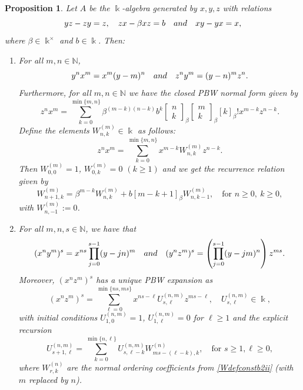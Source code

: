 \documentclass[10pt,a4paper]{amsart}
\newtheorem{proposition}{Proposition}
\begin{document}
\begin{proposition}\label{case(2)(ii)}
Let $A$ be the $\Bbbk$-algebra generated by $x,y,z$ with relations
\[
yz - zy = z, \quad zx - \beta xz = b \quad {\rm and} \quad xy - yx = x,
\]
where $\beta\in\Bbbk^{\times}$ and $b\in\Bbbk$. Then:
\begin{enumerate}
\item [\rm (1)] For all $m,n\in\mathbb{N}$,
\[
y^n x^m = x^m (y-m)^n \quad {\rm and}\quad z^n y^m = (y-n)^m z^n.
\]
Furthermore, for all $m,n\in\mathbb{N}$ we have the closed PBW normal form given by
\begin{equation}\label{znxmclosedconstb2ii}
z^n x^m = \sum_{k=0}^{\min\{m,n\}}
\beta^{(m-k)(n-k)}b^k\begin{bmatrix} n\\ k\end{bmatrix}_{\beta}\begin{bmatrix} m\\ k\end{bmatrix}_{\beta}[k]_{\beta}!x^{m-k}z^{n-k}.
\end{equation}
Define the elements $W^{(m)}_{n,k}\in\Bbbk$ as follows: 
\begin{equation}\label{Wdefconstb2ii}
z^n x^m = \sum_{k=0}^{\min\{m,n\}} x^{m-k}W^{(m)}_{n,k}z^{n-k}.
\end{equation}
Then $W^{(m)}_{0,0}=1$, $W^{(m)}_{0,k}=0$ $(k\ge 1)$ and we get the recurrence relation given by
\begin{equation}\label{Wrecconstb2ii}
W^{(m)}_{n+1,k}=\beta^{m-k}W^{(m)}_{n,k}+b[m-k+1]_{\beta}W^{(m)}_{n,k-1}, \quad  \text{for } n\ge 0,\ k\ge 0,
\end{equation}
with $W^{(m)}_{n,-1}:=0$.

\item [\rm (2)] For all $m, n, s \in \mathbb{N}$, we have that
\[
(x^n y^m)^s = x^{ns}\prod_{j=0}^{s-1}(y-jn)^m \quad {\rm and} \quad (y^n z^m)^s = \left(\prod_{j=0}^{s-1}(y-jm)^n\right)z^{ms}.
\]
Moreover, $(x^n z^m)^s$ has a unique PBW expansion as 
\begin{equation}\label{xnzmUconstb2ii}
(x^n z^m)^s = \sum_{\ell=0}^{\min\{ns,ms\}} x^{ns -\ell}U^{(n,m)}_{s,\ell}z^{ms-\ell}, \quad U^{(n,m)}_{s,\ell}\in\Bbbk,
\end{equation}
with initial conditions $U^{(n,m)}_{1,0}=1$, $U^{(n,m)}_{1,\ell}=0$ for $\ell\ge 1$ and the explicit recursion
\begin{equation}\label{Urecconstb2ii}
U^{(n,m)}_{s+1,\ell} = \sum_{k=0}^{\min\{n,\ell\}}U^{(n,m)}_{s,\ell-k}W^{(n)}_{ms-(\ell-k),k}, \quad \text{for } s\ge 1, \ell\ge 0,
\end{equation}
where $W^{(n)}_{r,k}$ are the normal ordering coefficients from \eqref{Wdefconstb2ii} {\rm (}with $m$ replaced by $n${\rm )}.


\end{enumerate}
\end{proposition}
\end{document}
